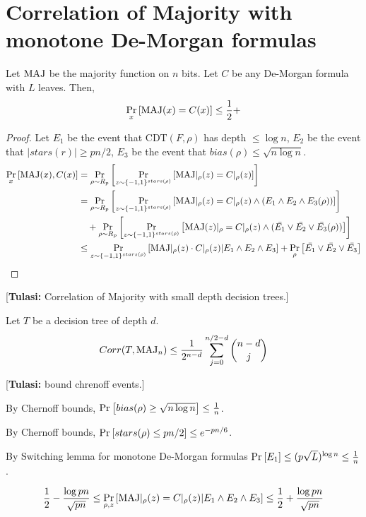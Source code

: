 \documentclass{article}
\newcommand{\cdt}{\mathrm{CDT}}
\newcommand{\tulasi}[1]{{\color{teal} [{\bf Tulasi:} #1]}}
\begin{document}
\section{Correlation of Majority with monotone De-Morgan formulas}
    \begin{theorem}
    \label{thm:corr with maj}
        Let $\mathrm{MAJ}$ be the majority function on $n$ bits. 
        Let $C$ be any De-Morgan formula with $L$ leaves. Then,
        $$\Pr_{x}\left[\mathrm{MAJ}(x) = C(x)\right] \leq \frac12 + $$
    \end{theorem}

    \begin{proof}
        Let $E_1$ be the event that $\cdt(F,\rho)$ has depth $\leq \log n$, $E_2$ be the event that $|stars(r)| \geq pn/2$, $E_3$ be the event that $bias(\rho) \leq \sqrt{n \log n}$.
        \begin{align*}
            \Pr_{x}\left[\mathrm{MAJ}(x),C(x)\right] &
                        = \Pr_{\rho \sim R_p}\left[\Pr_{z \sim \{-1,1\}^{stars(\rho)}}\left[\mathrm{MAJ}|_{\rho}(z) = C|_{\rho}(z)\right]\right] \\
                        &= \Pr_{\rho \sim R_p}\left[\Pr_{z \sim \{-1,1\}^{stars(\rho)}}\left[\mathrm{MAJ}|_\rho(z) = C|_\rho(z) \wedge (E_1 \wedge E_2 \wedge E_3(\rho))\right]\right]\\
                        &\hspace{10pt}+ \Pr_{\rho \sim R_p}\left[ \Pr_{z \sim \{-1,1\}^{stars(\rho)}}\left[\mathrm{MAJ}(z)|_\rho = C|_\rho(z) \wedge  (\bar{E_1} \vee \bar{E_2} \vee \bar{E_3}(\rho))\right]\right]\\
                        &\leq  \Pr_{z \sim \{-1,1\}^{stars(\rho)}}\left[\mathrm{MAJ}|_\rho(z)\cdot C|_\rho(z)| E_1 \wedge E_2 \wedge E_3\right] + \Pr_{\rho}\left[\bar{E_1} \vee \bar{E_2} \vee \bar{E_3}\right]
        \end{align*}
    \end{proof}
    
    
    
\tulasi{Correlation of Majority with small depth decision trees.}
\begin{claim}
    Let $T$ be a decision tree of depth $d$. 
        $$Corr(T,\mathrm{MAJ}_n) \leq \frac{1}{2^{n-d}}\sum_{j=0}^{n/2 -d} \binom{n-d}{j}$$
\end{claim}
\tulasi{bound chrenoff events.}

By Chernoff bounds, $\Pr_{}\left[bias(\rho) \geq \sqrt{n \log n}\right] \leq \frac1n$. 

By Chernoff bounds, $\Pr_{}\left[stars(\rho) \leq pn/2\right] \leq e^{-pn/6}$.

By Switching lemma for monotone De-Morgan formulas 
$\Pr_{}\left[E_1\right] \leq (p\sqrt{L})^{\log n} \leq \frac1n$.

    $$ \frac12 - \frac{\log {pn}}{\sqrt{pn}}\leq \Pr_{\rho,z}\left[\mathrm{MAJ}|_\rho(z) = C|_\rho(z)|E_1 \wedge E_2 \wedge E_3\right] \leq \frac12 + \frac{\log pn}{\sqrt{pn}}$$
\end{document}
